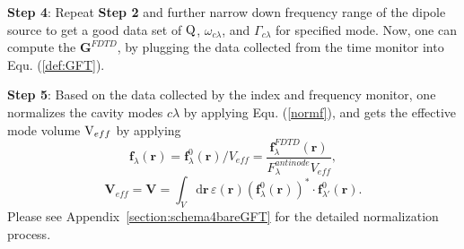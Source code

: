 \textbf{Step 4}: Repeat {\bf Step 2} and further narrow down frequency range of the dipole source to get a good data set of ${\rm Q}$, $\omega_{c\lambda}$, and $\Gamma_{c\lambda}$ for specified mode.
Now, one can compute the $\mathbf{G}^{FDTD}$, by plugging the data collected from the time monitor into Equ. (\ref{def:GFT}).

\textbf{Step 5}: Based on the data collected by the index and frequency monitor,
one normalizes the cavity modes $c\lambda$ by applying Equ. (\ref{normf}),
and gets the effective mode volume ${\rm V}_{eff}$ by applying
\begin{equation}
 \label{normf}
\mathbf{f}_\lambda(\mathbf{r})=\mathbf{f}_\lambda^0(\mathbf{r})/V_{eff}=\frac{\mathbf{f}_\lambda^{FDTD}(\mathbf{r})}{F_\lambda^{antinode}V_{eff}},
\end{equation}
\begin{equation}
 \mathbf{V}_{eff}=\mathbf{V}=\int_V \! \mathrm{d}\mathbf{r} \, \varepsilon(\mathbf{r})(\mathbf{f}^0_\lambda(\mathbf{r}))^* \cdot \mathbf{f}^0_{\lambda'}(\mathbf{r}).
\end{equation}
Please see Appendix~\ref{section:schema4bareGFT} for the detailed normalization process.




